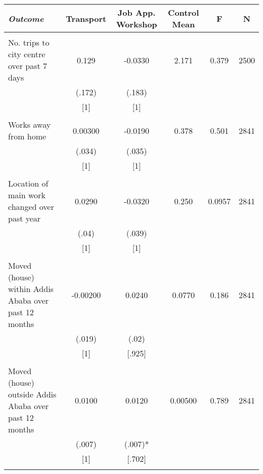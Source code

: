 \begin{tabular}{lccccc} \hline
\multicolumn{1}{l}{\emph{Outcome}} & \multicolumn{1}{c}{Transport} &\multicolumn{1}{c}{Job App. Workshop} & \multicolumn{1}{c}{Control Mean} & \multicolumn{1}{c}{F} & \multicolumn{1}{c}{N} \\ \hline \\
No. trips to city centre over past 7 days & 0.129 & -0.0330 & 2.171 & 0.379 & 2500 \\
& (.172) & (.183) &  &  &  \\
& [1] & [1] &  &  &  \\
&  &  &  &  &  \\
Works away from home & 0.00300 & -0.0190 & 0.378 & 0.501 & 2841 \\
& (.034) & (.035) &  &  &  \\
& [1] & [1] &  &  &  \\
&  &  &  &  &  \\
Location of main work changed over past year  & 0.0290 & -0.0320 & 0.250 & 0.0957 & 2841 \\
& (.04) & (.039) &  &  &  \\
& [1] & [1] &  &  &  \\
&  &  &  &  &  \\
Moved (house) within Addis Ababa over past 12 months & -0.00200 & 0.0240 & 0.0770 & 0.186 & 2841 \\
& (.019) & (.02) &  &  &  \\
& [1] & [.925] &  &  &  \\
&  &  &  &  &  \\
Moved (house) outside Addis Ababa over past 12 months & 0.0100 & 0.0120 & 0.00500 & 0.789 & 2841 \\
& (.007) & (.007)* &  &  &  \\
& [1] & [.702] &  &  &  \\
&  &  &  &  &  \\ \hline
\end{tabular}
